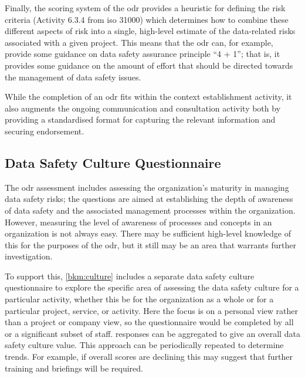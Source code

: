 Finally, the scoring system of the \gls{odr} provides a heuristic for defining the risk criteria
(Activity 6.3.4 from \gls{iso} 31000)
which determines how to combine these different aspects of risk into a single, high-level estimate of the data-related risks associated with a given project. This means that the \gls{odr} can, for example, provide some guidance on data safety assurance principle ``4 + 1''; that is, it provides some guidance on the amount of effort that should be directed towards the management of data safety issues.
 
While the completion of an \gls{odr} fits within the context establishment activity, it also augments the ongoing communication and consultation activity both by providing a standardised format for capturing the relevant \gls{information} and securing endorsement.

\subsection{Data Safety Culture Questionnaire}
The \gls{odr} assessment includes assessing the organization's maturity in managing data safety risks; the questions are aimed at establishing the depth of awareness of data safety and the associated management processes within the organization. However, measuring the level of awareness of processes and concepts in an organization is not always easy. There may be sufficient high-level knowledge of this for the purposes of the \gls{odr}, but it still may be an area that warrants further investigation.

To support this, \autoref{bkm:culture} includes a separate data safety culture questionnaire to explore the specific area of assessing the data safety culture for a particular activity, whether this be for the organization as a whole or for a particular project, service, or activity. Here the focus is on a personal view rather than a project or company view, so the questionnaire would be completed by all or a significant subset of staff. \Glspl{response} can be aggregated to give an overall data safety culture value. This approach can be periodically repeated to determine trends. For example, if overall scores are declining this may suggest that further training and briefings will be required.

